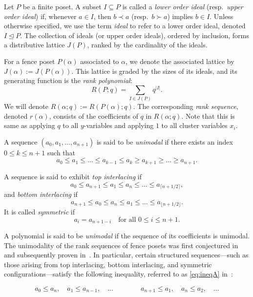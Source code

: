 \documentclass{article}
\theoremstyle{remark}
\begin{document}
Let \( P \) be a finite poset. A subset \( I \subseteq P\) is called a \emph{lower order ideal} (resp.\ \emph{upper order ideal}) if, whenever \( a \in I \), then \( b \prec a \) (resp.\ \( b \succ a \)) implies \( b \in I \). Unless otherwise specified, we use the term \emph{ideal} to refer to a lower order ideal, denoted \( I \trianglelefteq P \). The collection of ideals (or upper order ideals), ordered by inclusion, forms a distributive lattice \( J(P) \), ranked by the cardinality of the ideals.

For a fence poset \( P(\alpha) \) associated to $\alpha$, we denote the associated lattice by \( J(\alpha) := J(P(\alpha)) \). This lattice is graded by the sizes of its ideals, and its generating function is the \emph{rank polynomial}:
\[
R(P;q)=\sum_{I \in J(P)} q^{|I|}.
\]
We will denote $R(\alpha;q):=R(P(\alpha);q)$. The corresponding \emph{rank sequence}, denoted \( r(\alpha) \), consists of the coefficients of \( q \) in \( R(\alpha; q) \). Note that this is same as applying $q$ to all $y$-variables and applying $1$ to all cluster variables $x_i$.

A sequence \( (a_0, a_1, \ldots, a_{n+1}) \) is said to be \emph{unimodal} if there exists an index \( 0 \leq k \leq n+1 \) such that
\[
a_0 \leq a_1 \leq \dots \leq a_{k-1} \leq a_k \geq a_{k+1} \geq \dots \geq a_{n+1}.
\]

A sequence is said to exhibit \emph{top interlacing} if
\[
a_0 \leq a_{n+1} \leq a_1 \leq a_{n} \leq \dots \leq a_{\lceil {n+1}/2\rceil},
\]
and \emph{bottom interlacing} if
\[
a_{n+1} \leq a_0 \leq a_{n} \leq a_1 \leq \dots \leq a_{\lfloor {n+1}/2\rfloor}.
\]
It is called \emph{symmetric} if
\[
a_i = a_{n+1-i} \quad \text{for all } 0 \leq i \leq n+1.
\]

A polynomial is said to be \emph{unimodal} if the sequence of its coefficients is unimodal. The unimodality of the rank sequences of fence posets was first conjectured in~\cite{MGO20} and subsequently proven in~\cite{OR23}. In particular, certain structured sequences—such as those arising from top interlacing, bottom interlacing, and symmetric configurations—satisfy the following inequality, referred to as \eqref{eq:ineqA} in~\cite{OR23}:

\begin{equation*}
a_{0} \leq a_{n},\quad a_{1} \leq a_{n-1},\quad \ldots \qquad\qquad a_{n+1} \leq a_{1},\quad a_{n} \leq a_{2},\quad \ldots \label{eq:ineqA}\tag{Ineq A}
\end{equation*}
\end{document}
